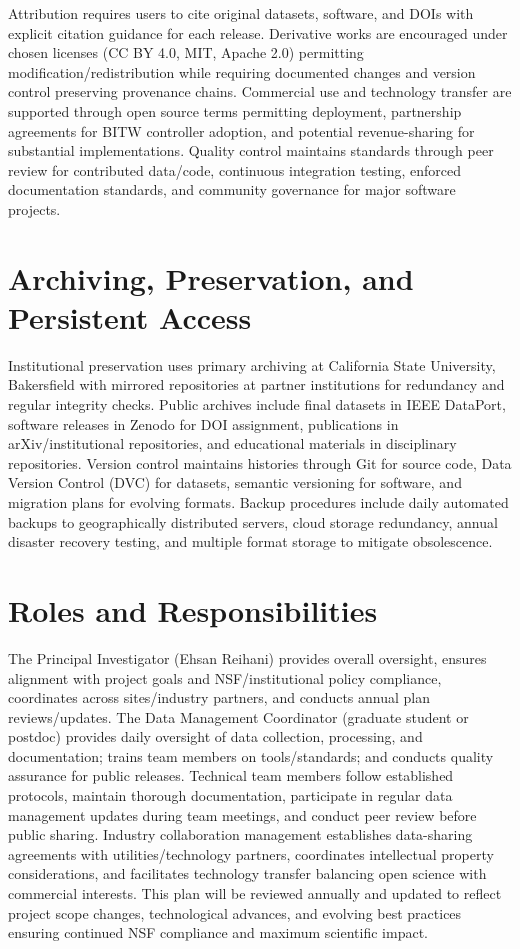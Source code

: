 \documentclass[12pt]{article}
\begin{document}
Attribution requires users to cite original datasets, software, and DOIs with explicit citation guidance for each release. Derivative works are encouraged under chosen licenses (CC BY 4.0, MIT, Apache 2.0) permitting modification/redistribution while requiring documented changes and version control preserving provenance chains. Commercial use and technology transfer are supported through open source terms permitting deployment, partnership agreements for BITW controller adoption, and potential revenue-sharing for substantial implementations. Quality control maintains standards through peer review for contributed data/code, continuous integration testing, enforced documentation standards, and community governance for major software projects.

\section{Archiving, Preservation, and Persistent Access}

Institutional preservation uses primary archiving at California State University, Bakersfield with mirrored repositories at partner institutions for redundancy and regular integrity checks. Public archives include final datasets in IEEE DataPort, software releases in Zenodo for DOI assignment, publications in arXiv/institutional repositories, and educational materials in disciplinary repositories. Version control maintains histories through Git for source code, Data Version Control (DVC) for datasets, semantic versioning for software, and migration plans for evolving formats. Backup procedures include daily automated backups to geographically distributed servers, cloud storage redundancy, annual disaster recovery testing, and multiple format storage to mitigate obsolescence.

\section{Roles and Responsibilities}

The Principal Investigator (Ehsan Reihani) provides overall oversight, ensures alignment with project goals and NSF/institutional policy compliance, coordinates across sites/industry partners, and conducts annual plan reviews/updates. The Data Management Coordinator (graduate student or postdoc) provides daily oversight of data collection, processing, and documentation; trains team members on tools/standards; and conducts quality assurance for public releases. Technical team members follow established protocols, maintain thorough documentation, participate in regular data management updates during team meetings, and conduct peer review before public sharing. Industry collaboration management establishes data-sharing agreements with utilities/technology partners, coordinates intellectual property considerations, and facilitates technology transfer balancing open science with commercial interests. This plan will be reviewed annually and updated to reflect project scope changes, technological advances, and evolving best practices ensuring continued NSF compliance and maximum scientific impact.
\end{document}
